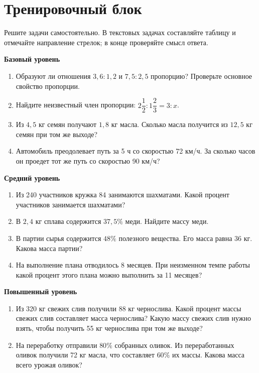 \documentclass[a4paper,12pt]{article}
\newcommand{\ex}[1]{\par\smallskip\textcolor{darkaccent}{\textbf{#1}}\par}
\begin{document}
\section*{Тренировочный блок}
Решите задачи самостоятельно. В текстовых задачах составляйте таблицу и отмечайте направление стрелок; в конце проверяйте смысл ответа.
\ex{Базовый уровень}
\begin{enumerate}[label=\arabic*.]
\item Образуют ли отношения $3{,}6:1{,}2$ и $7{,}5:2{,}5$ пропорцию? Проверьте основное свойство пропорции.
\item Найдите неизвестный член пропорции: $2\dfrac12:1\dfrac23=3:x$.
\item Из $4{,}5$ кг семян получают $1{,}8$ кг масла. Сколько масла получится из $12{,}5$ кг семян при том же выходе?
\item Автомобиль преодолевает путь за 5 ч со скоростью 72 км/ч. За сколько часов он проедет тот же путь со скоростью 90 км/ч?
\end{enumerate}
\ex{Средний уровень}
\begin{enumerate}[label=\arabic*.,start=5]
\item Из 240 участников кружка 84 занимаются шахматами. Какой процент участников занимается шахматами?
\item В $2{,}4$ кг сплава содержится $37{,}5\%$ меди. Найдите массу меди.
\item В партии сырья содержится $48\%$ полезного вещества. Его масса равна 36 кг. Какова масса партии?
\item На выполнение плана отводилось 8 месяцев. При неизменном темпе работы какой процент этого плана можно выполнить за 11 месяцев?
\end{enumerate}
\ex{Повышенный уровень}
\begin{enumerate}[label=\arabic*.,start=9]
\item Из 320 кг свежих слив получили 88 кг чернослива. Какой процент массы свежих слив составляет масса чернослива? Какую массу свежих слив нужно взять, чтобы получить 55 кг чернослива при том же выходе?
\item На переработку отправили $80\%$ собранных оливок. Из переработанных оливок получили 72 кг масла, что составляет $60\%$ их массы. Какова масса всего урожая оливок?
\end{enumerate}
\clearpage
\end{document}
